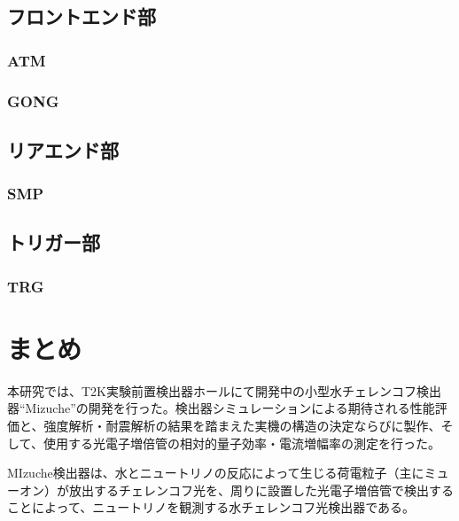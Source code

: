 \documentclass[11pt]{jreport}
\begin{document}
\section{フロントエンド部}
\subsection{ATM}
\subsection{GONG}
\section{リアエンド部}
\subsection{SMP}
\section{トリガー部}
\subsection{TRG}
\fi


\chapter{まとめ}

本研究では、T2K実験前置検出器ホールにて開発中の小型水チェレンコフ検出器``Mizuche''の開発を行った。検出器シミュレーションによる期待される性能評価と、強度解析・耐震解析の結果を踏まえた実機の構造の決定ならびに製作、そして、使用する光電子増倍管の相対的量子効率・電流増幅率の測定を行った。

MIzuche検出器は、水とニュートリノの反応によって生じる荷電粒子（主にミューオン）が放出するチェレンコフ光を、周りに設置した光電子増倍管で検出することによって、ニュートリノを観測する水チェレンコフ光検出器である。
\end{document}

